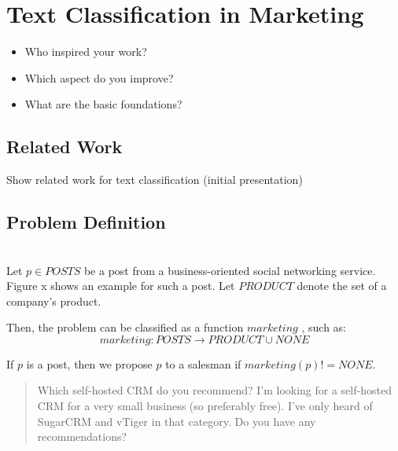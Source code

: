 
\section{Text Classification in Marketing}
\label{sec:related}
\begin{itemize}
	\item Who inspired your work?
	\item Which aspect do you improve?
	\item What are the basic foundations?
\end{itemize}

\subsection{Related Work}

Show related work for text classification (initial presentation)

\subsection{Problem Definition}

 \\
Let $p \in POSTS$ be a post from a business-oriented social networking service.
Figure x shows an example for such a post.
Let $PRODUCT$ denote the set of a company's product.

Then, the problem can be classified as a function $marketing$ , such as:
\begin{displaymath}
	marketing: POSTS \to PRODUCT \cup {NONE}
\end{displaymath}

If $p$ is a post, then we propose $p$ to a salesman if $marketing(p) != NONE$.


\begin{quote}
	Which self-hosted CRM do you recommend?
	I'm looking for a self-hosted CRM for a very small business (so preferably free).
	I've only heard of SugarCRM and vTiger in that category. Do you have any recommendations?
\end{quote}
